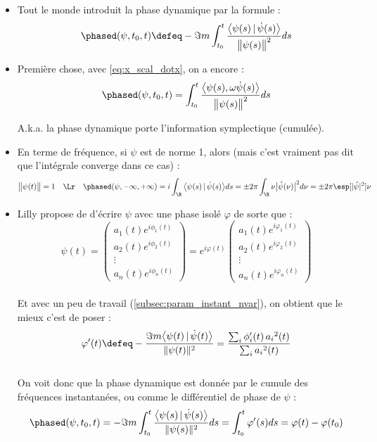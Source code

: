 \begin{itemize}
	
	\item Tout le monde introduit la phase dynamique par la formule :
	\begin{equation}\label{eq:phase_dyn}
		\phased(\psi,t_0,t) \defeq -\Im m \int_{t_0}^t\frac{\big\langle \psi(s) \, |\, \dot{\psi}(s) \big\rangle}{\big\|\psi(s)\big\|^2} ds
	\end{equation}
	
	\item Première chose, avec \eqref{eq:x_scal_dotx}, on a encore :
	\[\phased(\psi,t_0,t) = \int_{t_0}^t\frac{\big\langle \psi(s), \omega\dot{\psi}(s) \big\rangle}{\big\|\psi(s)\big\|^2} ds\]
	
	A.k.a. la phase dynamique porte l'information symplectique (cumulée).
	
	\item En terme de fréquence, si $\psi$ est de norme 1, alors (mais c'est vraiment pas dit que l'intégrale converge dans ce cas) :
	\[\big\|\psi(t)\big\|=1\quad \Lr\quad \phased(\psi, -\infty, +\infty) = i\int_\R \big\langle \psi(s) \, |\, \dot{\psi}(s) \big\rangle ds = \pm 2\pi\int_\R \nu\big|\hat{\psi}(\nu)\big|^2 d\nu = \pm 2\pi \esp[|\hat{\psi}|^2]{\nu}\]
	
	\item Lilly \cite{lilly_analysis_2012} propose de d'écrire $\psi$ avec une phase isolé $\varphi$ de sorte que :
	\[\psi(t) = \begin{pmatrix} a_1(t)e^{i\phi_1(t)} \\ a_2(t)e^{i\phi_2(t)} \\ \vdots \\ a_n(t)e^{i\phi_n(t)}
	\end{pmatrix} = e^{i\varphi(t)}\begin{pmatrix} a_1(t)e^{i\varphi_1(t)} \\ a_2(t)e^{i\varphi_2(t)} \\ \vdots \\ a_n(t)e^{i\varphi_n(t)}
	\end{pmatrix}\]
	\\
	Et avec un peu de travail (\cref{subsec:param_instant_nvar}), on obtient que le mieux c'est de poser :
	\[\varphi'(t) \defeq -\frac{\Im m\big\langle \psi(t) \,|\, \dot{\psi}(t) \big\rangle}{\|\psi(t)\|^2} = \frac{\sum_i\phi_i'(t)\,{a_i}^2(t)}{\sum_i{a_i}^2(t)}\]
	\\
	On voit donc que la phase dynamique est donnée par le cumule des fréquences instantanées, ou comme le différentiel de phase de $\psi$ :
	\[\phased(\psi,t_0,t) = -\Im m\int_{t_0}^t \frac{\big\langle \psi(s) \,|\, \dot{\psi}(s) \big\rangle}{\|\psi(s)\|^2} ds = \int_{t_0}^t \varphi'(s)ds = \varphi(t)-\varphi(t_0)\]
	

\end{itemize}
